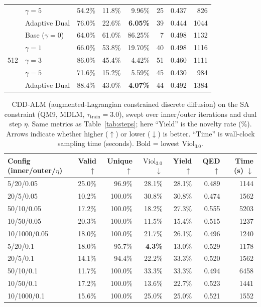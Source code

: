 \documentclass{article}
\begin{document}
\begin{table}[H]
\begin{tabular}{cl rrrrrr}
  & $\gamma{=}5$        & 54.2\% & 11.8\% & 9.96\%  & 25 & 0.437 & 826 \\
  & Adaptive Dual       & 76.0\% & 22.6\% & \textbf{6.05\%}  & 39 & 0.444 & 1044 \\
\midrule
\multirow{5}{*}{512}
  & Base ($\gamma{=}0$) & 64.0\% & 61.0\% & 86.25\% & 7  & 0.498 & 1132 \\
  & $\gamma{=}1$        & 66.0\% & 53.8\% & 19.70\% & 40 & 0.498 & 1116 \\
  & $\gamma{=}3$        & 86.0\% & 45.4\% & 4.42\%  & 51 & 0.460 & 1111 \\
  & $\gamma{=}5$        & 71.6\% & 15.2\% & 5.59\%  & 45 & 0.430 & 984 \\
  & Adaptive Dual       & 88.4\% & 43.0\% & \textbf{4.07\%}  & 44 & 0.492 & 1384 \\
\bottomrule
\end{tabular}
\end{table}

\begin{table}[H]
\centering
\caption{CDD-ALM (augmented-Lagrangian constrained discrete diffusion) on the SA constraint (QM9, MDLM, $\tau_{\text{train}}{=}3.0$), swept over inner/outer iterations and dual step $\eta$. Same metrics as Table~\ref{tab:steps}; here ``Yield'' is the novelty rate (\%). Arrows indicate whether higher ($\uparrow$) or lower ($\downarrow$) is better. ``Time'' is wall-clock sampling time (seconds). Bold = lowest $\mathrm{Viol}_{3.0}$.}
\label{tab:cdd-alm}
\begin{tabular}{l rrrrrr}
\toprule
Config (inner/outer/$\eta$) & Valid $\uparrow$ & Unique $\uparrow$ & $\mathrm{Viol}_{3.0}$ $\downarrow$ & Yield $\uparrow$ & QED $\uparrow$ & Time (s) $\downarrow$ \\
\midrule
5/20/0.05    & 25.0\% & 96.9\%  & 28.1\% & 28.1\% & 0.489 & 1144 \\
20/5/0.05    & 10.2\% & 100.0\% & 30.8\% & 30.8\% & 0.474 & 1562 \\
50/10/0.05   & 17.2\% & 100.0\% & 18.2\% & 27.3\% & 0.555 & 5203 \\
10/50/0.05   & 20.3\% & 100.0\% & 11.5\% & 15.4\% & 0.515 & 1237 \\
10/1000/0.05 & 18.0\% & 100.0\% & 21.7\% & 26.1\% & 0.496 & 1240 \\
5/20/0.1     & 18.0\% & 95.7\%  & \textbf{4.3\%} & 13.0\% & 0.529 & 1178 \\
20/5/0.1     & 14.1\% & 94.4\%  & 22.2\% & 33.3\% & 0.520 & 1562 \\
50/10/0.1    & 11.7\% & 100.0\% & 33.3\% & 33.3\% & 0.494 & 6458 \\
10/50/0.1    & 17.2\% & 100.0\% & 13.6\% & 22.7\% & 0.523 & 1441 \\
10/1000/0.1  & 15.6\% & 100.0\% & 25.0\% & 25.0\% & 0.521 & 1552 \\
\bottomrule
\end{tabular}
\end{table}
\end{document}
